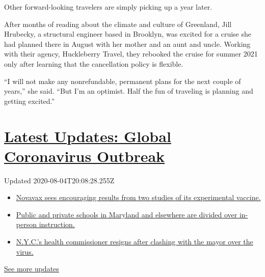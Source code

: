 Other forward-looking travelers are simply picking up a year later.

After months of reading about the climate and culture of Greenland, Jill
Hrubecky, a structural engineer based in Brooklyn, was excited for a
cruise she had planned there in August with her mother and an aunt and
uncle. Working with their agency, Huckleberry Travel, they rebooked the
cruise for summer 2021 only after learning that the cancellation policy
is flexible.

``I will not make any nonrefundable, permanent plans for the next couple
of years,'' she said. ``But I'm an optimist. Half the fun of traveling
is planning and getting excited.''

\hypertarget{latest-updates-global-coronavirus-outbreak}{%
\section{\texorpdfstring{\href{https://www.nytimes.com/2020/08/04/world/coronavirus-cases.html?action=click\&pgtype=Article\&state=default\&region=MAIN_CONTENT_1\&context=storylines_live_updates}{Latest
Updates: Global Coronavirus
Outbreak}}{Latest Updates: Global Coronavirus Outbreak}}\label{latest-updates-global-coronavirus-outbreak}}

Updated 2020-08-04T20:08:28.255Z

\begin{itemize}
\tightlist
\item
  \href{https://www.nytimes.com/2020/08/04/world/coronavirus-cases.html?action=click\&pgtype=Article\&state=default\&region=MAIN_CONTENT_1\&context=storylines_live_updates\#link-1228a480}{Novavax
  sees encouraging results from two studies of its experimental
  vaccine.}
\item
  \href{https://www.nytimes.com/2020/08/04/world/coronavirus-cases.html?action=click\&pgtype=Article\&state=default\&region=MAIN_CONTENT_1\&context=storylines_live_updates\#link-4825b93}{Public
  and private schools in Maryland and elsewhere are divided over
  in-person instruction.}
\item
  \href{https://www.nytimes.com/2020/08/04/world/coronavirus-cases.html?action=click\&pgtype=Article\&state=default\&region=MAIN_CONTENT_1\&context=storylines_live_updates\#link-4d1eafa8}{N.Y.C.'s
  health commissioner resigns after clashing with the mayor over the
  virus.}
\end{itemize}

\href{https://www.nytimes.com/2020/08/04/world/coronavirus-cases.html?action=click\&pgtype=Article\&state=default\&region=MAIN_CONTENT_1\&context=storylines_live_updates}{See
more updates}

